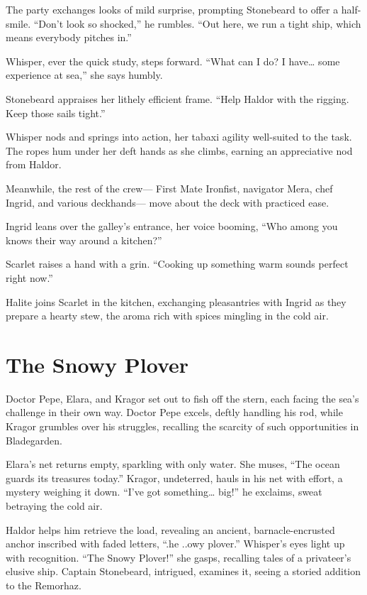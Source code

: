 \documentclass[
  letterpaper,12pt,twoside,twocolumn,openany,
  nodeprecatedcode,bg=full]{dndbook}
\begin{document}
The party exchanges looks of mild surprise, prompting Stonebeard to
offer a half-smile. ``Don't look so shocked,'' he rumbles. ``Out here,
we run a tight ship, which means everybody pitches in.''

Whisper, ever the quick study, steps forward. ``What can I do? I
have\ldots{} some experience at sea,'' she says humbly.

Stonebeard appraises her lithely efficient frame. ``Help Haldor with the
rigging. Keep those sails tight.''

Whisper nods and springs into action, her tabaxi agility well-suited to
the task. The ropes hum under her deft hands as she climbs, earning an
appreciative nod from Haldor.

Meanwhile, the rest of the crew--- First Mate Ironfist, navigator Mera,
chef Ingrid, and various deckhands--- move about the deck with practiced
ease.

Ingrid leans over the galley's entrance, her voice booming, ``Who among
you knows their way around a kitchen?''

Scarlet raises a hand with a grin. ``Cooking up something warm sounds
perfect right now.''

Halite joins Scarlet in the kitchen, exchanging pleasantries with Ingrid
as they prepare a hearty stew, the aroma rich with spices mingling in
the cold air.

\section{The Snowy Plover}\label{the-snowy-plover}

Doctor Pepe, Elara, and Kragor set out to fish off the stern, each
facing the sea's challenge in their own way. Doctor Pepe excels, deftly
handling his rod, while Kragor grumbles over his struggles, recalling
the scarcity of such opportunities in Bladegarden.

Elara's net returns empty, sparkling with only water. She muses, ``The
ocean guards its treasures today.'' Kragor, undeterred, hauls in his net
with effort, a mystery weighing it down. ``I've got something\ldots{}
big!'' he exclaims, sweat betraying the cold air.

Haldor helps him retrieve the load, revealing an ancient,
barnacle-encrusted anchor inscribed with faded letters, ``.he ..owy
plover.'' Whisper's eyes light up with recognition. ``The Snowy
Plover!'' she gasps, recalling tales of a privateer's elusive ship.
Captain Stonebeard, intrigued, examines it, seeing a storied addition to
the Remorhaz.
\end{document}
